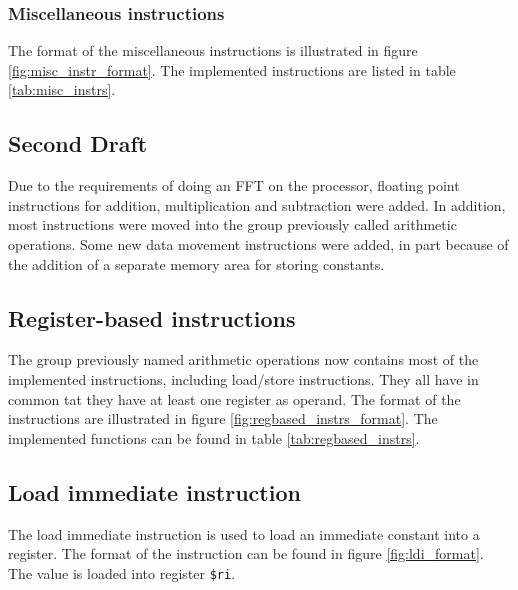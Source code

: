 


\subsubsection{Miscellaneous instructions}
The format of the miscellaneous instructions is illustrated in figure
\ref{fig:misc_instr_format}. The implemented instructions are listed in table
\ref{tab:misc_instrs}.




\FloatBarrier
\subsection{Second Draft}

Due to the requirements of doing an FFT on the processor, floating point
instructions for addition, multiplication and subtraction were added.
In addition, most instructions were moved into the group previously called
arithmetic operations. Some new data movement instructions were added, in part
because of the addition of a separate memory area for storing constants.

\subsection{Register-based instructions}

The group previously named arithmetic operations now contains most of the
implemented instructions, including load/store instructions. They all have
in common tat they have at least one register as operand. The format of the
instructions are illustrated in figure \ref{fig:regbased_instrs_format}. The
implemented functions can be found in table \ref{tab:regbased_instrs}.




\subsection{Load immediate instruction}
The load immediate instruction is used to load an immediate constant into a
register. The format of the instruction can be found in figure
\ref{fig:ldi_format}. The value is loaded into register \texttt{\$ri}.



